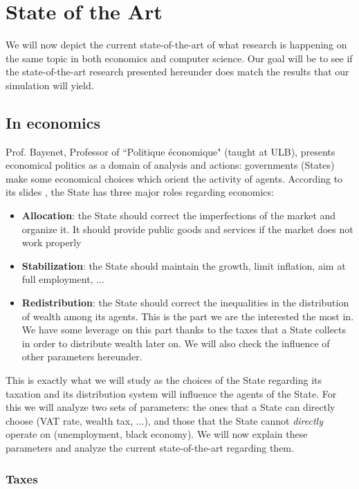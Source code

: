 \chapter{State of the Art}\label{section:state_of_the_art}

We will now depict the current state-of-the-art of what research is happening on the same topic in both economics and computer science.
Our goal will be to see if the state-of-the-art research presented hereunder does match the results that our simulation will yield.

\section{In economics}

Prof. Bayenet, Professor of ``Politique économique" (taught at ULB), presents economical politics as a domain of analysis and actions: governments (States) make some economical choices which orient the activity of agents. According to its slides \cite{bayenetSlides1}, the State has three major roles regarding economics:

\begin{itemize}
    \item \textbf{Allocation}: the State should correct the imperfections of the market and organize it. It should provide public goods and services if the market does not work properly
    \item \textbf{Stabilization}: the State should maintain the growth, limit inflation, aim at full employment, ... 
    \item \textbf{Redistribution}: the State should correct the inequalities in the distribution of wealth among its agents. This is the part we are the interested the most in. We have some leverage on this part thanks to the taxes that a State collects in order to distribute wealth later on. We will also check the influence of other parameters hereunder.
\end{itemize} 

This is exactly what we will study as the choices of the State regarding its taxation and its distribution system will influence the agents of the State. For this we will analyze two sets of parameters: the ones that a State can directly choose (VAT rate, wealth tax, ...), and those that the State cannot \emph{directly} operate on (unemployment, black economy). We will now explain these parameters and analyze the current state-of-the-art regarding them.

\subsection{Taxes}

